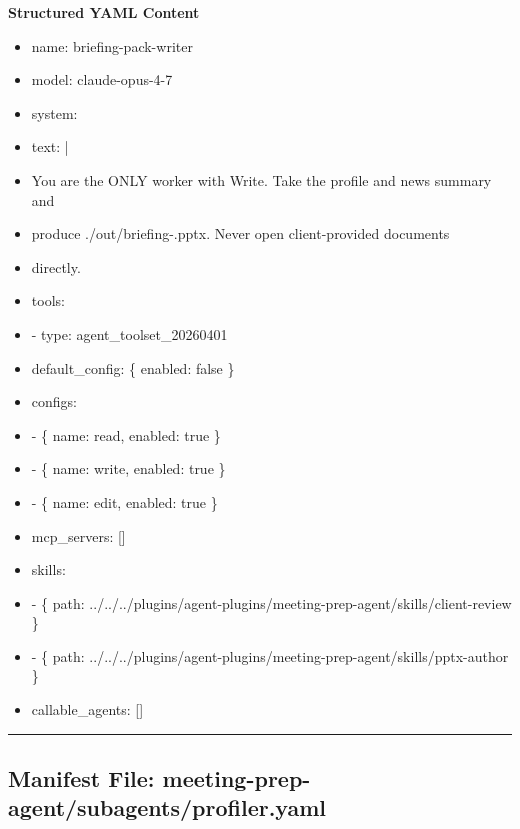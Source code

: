 \documentclass[11pt]{article}
\begin{document}
\textbf{Structured YAML Content}
\begin{itemize}[leftmargin=*,itemsep=2pt,topsep=2pt]
\item {} name: briefing-pack-writer
\item {} model: claude-opus-4-7
\item {} system:
\item {} text: |
\item {} You are the ONLY worker with Write. Take the profile and news summary and
\item {} produce ./out/briefing-.pptx. Never open client-provided documents
\item {} directly.
\item {} tools:
\item {} - type: agent\_\allowbreak{}toolset\_\allowbreak{}20260401
\item {} default\_\allowbreak{}config: \{ enabled: false \}
\item {} configs:
\item {} - \{ name: read, enabled: true \}
\item {} - \{ name: write, enabled: true \}
\item {} - \{ name: edit, enabled: true \}
\item {} mcp\_\allowbreak{}servers: []
\item {} skills:
\item {} - \{ path: ../../../plugins/agent-plugins/meeting-prep-agent/skills/client-review \}
\item {} - \{ path: ../../../plugins/agent-plugins/meeting-prep-agent/skills/pptx-author \}
\item {} callable\_\allowbreak{}agents: []
\end{itemize}

\vspace{0.8em}\hrule\vspace{0.8em}

\subsection{Manifest File: meeting-prep-agent/subagents/profiler.yaml}\label{file:meeting-prep-agent-subagents-profiler-yaml}
\end{document}

